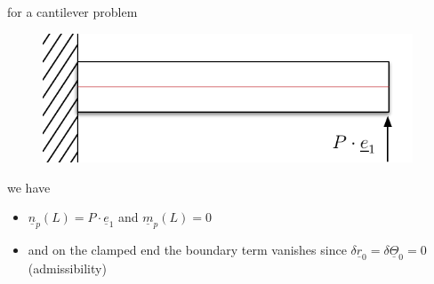 \begin{frame}
  \vspace{0.5em}
  \begin{multicols}{2}
    \noindent
    for a cantilever problem
    \begin{figure}
      \centering
      \includegraphics[width=11cm, keepaspectratio=true]{sections/cosserat_rods/images/SimpleCanitleverExample}
    \end{figure}
    
    we have
    \begin{itemize}
      \item $\underline{n}_p(L) = P \cdot \underline{e}_1$ and $\underline{m}_p(L) = 0$
      \item and on the clamped end the boundary term vanishes since $\delta \underline{r}_0 = \delta \underline{\Theta}_0 = 0$ (admissibility)
    \end{itemize} 
  \end{multicols}
  
\end{frame}




